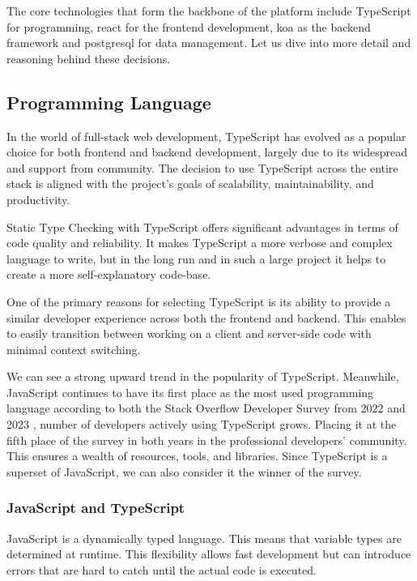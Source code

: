 The core technologies that form the backbone of the platform include TypeScript for programming, \gls{react} for the frontend development, \gls{koa} as the backend framework and \gls{postgresql} for data management.
Let us dive into more detail and reasoning behind these decisions.

\subsection{Programming Language}
\label{subsec:programming-language}
In the world of full-stack web development, TypeScript has evolved as a popular choice for both frontend and backend development, largely due to its widespread and support from community.
The decision to use TypeScript across the entire stack is aligned with the project's goals of scalability, maintainability, and productivity.

Static Type Checking with TypeScript offers significant advantages in terms of code quality and reliability.
It makes TypeScript a more verbose and complex language to write, but in the long run and in such a large project it helps to create a more self-explanatory code-base.

One of the primary reasons for selecting TypeScript is its ability to provide a similar developer experience across both the frontend and backend.
This enables to easily transition between working on a client and server-side code with minimal context switching.

We can see a strong upward trend in the popularity of TypeScript. Meanwhile, JavaScript continues to have its first place as the most used programming language according to both the Stack Overflow Developer Survey from 2022 \cite{StackOverflow2022} and 2023 \cite{StackOverflow2023}, number of developers actively using TypeScript grows. Placing it at the fifth place of the survey in both years in the professional developers' community.
This ensures a wealth of resources, tools, and libraries.
Since TypeScript is a superset of JavaScript, we can also consider it the winner of the survey.

\subsubsection{JavaScript and TypeScript}
JavaScript is a dynamically typed language.
This means that variable types are determined at runtime.
This flexibility allows fast development but can introduce errors that are hard to catch until the actual code is executed.

